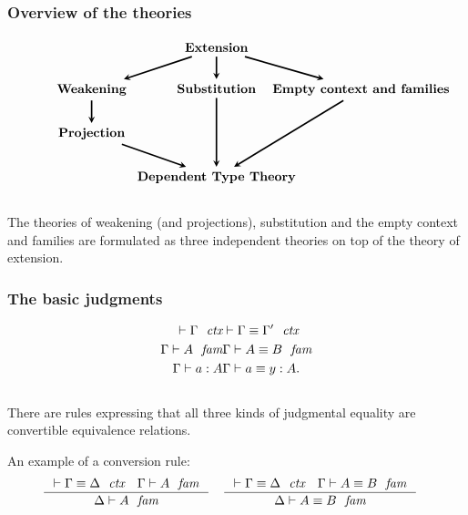 \documentclass[handout]{beamer}
\begin{document}
\begin{frame}
\frametitle{\bf Overview of the theories}
\begin{equation*}
\begin{tikzcd}[ampersand replacement=\&,column sep=0em]
{} \& \textbf{Extension} \ar[very thick,-stealth]{dr} \ar[very thick,-stealth]{d} \ar[very thick,-stealth]{dl}
  \\
\textbf{Weakening} \ar[very thick,-stealth]{d} \& \textbf{Substitution} \ar[very thick,-stealth]{dd} \& \makebox[3cm]{\textbf{Empty context and families}} \ar[very thick,-stealth]{ddl}
\\
\textbf{Projection} \ar[very thick,-stealth]{dr}
\\
{} \& \textbf{Dependent Type Theory}
\end{tikzcd}
\end{equation*}
\\[2em]
\pause
The theories of weakening (and projections), substitution and the empty context and families are formulated as three independent theories on top of the theory of extension.
\end{frame}

\begin{frame}
\frametitle{\bf The basic judgments}
\begin{align*}
\jalign\jctx{\Gamma} 
& \jalign\jctxeq{\Gamma}{\Gamma'}
  \\
\jalign\jfam{\Gamma}{A} 
& \jalign\jfameq{\Gamma}{A}{B}
  \\
\jalign\jterm{\Gamma}{A}{a} 
& \jalign\jtermeq{\Gamma}{A}{a}{y}.
\end{align*}
\\[\baselineskip]
There are rules expressing that all three kinds of judgmental equality are
convertible equivalence relations.

\pause
An example of a conversion rule:
\begin{align*}
& \inference
  { \jctxeq{\Gamma}{\Delta}
    \jfam{\Gamma}{A}
    }
  { \jfam{\Delta}{A}
    }
& & \inference
    { \jctxeq{\Gamma}{\Delta}
      \jfameq{\Gamma}{A}{B}
      }
    { \jfameq{\Delta}{A}{B}
      }
\end{align*}
\end{frame}
\end{document}
